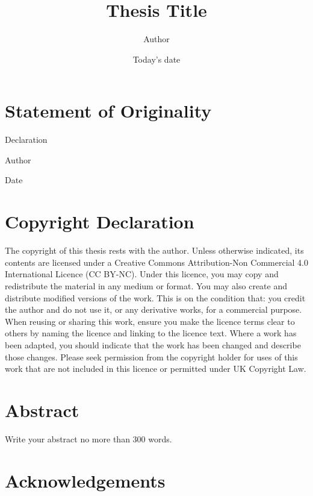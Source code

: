\documentclass[12pt]{report}
\begin{document}
\title{Thesis Title}
\author{Author}
\date{Today's date} 

\maketitle
\newpage
{}
\setcounter{page}{2}
\chapter*{Statement of Originality}
Declaration

\hspace{5.5in} Author

\hspace{5.5in} Date



\chapter*{Copyright Declaration}
The copyright of this thesis rests with the author. Unless otherwise indicated,
its contents are licensed under a Creative Commons Attribution-Non
Commercial 4.0 International Licence (CC BY-NC).
Under this licence, you may copy and redistribute the material in any medium
or format. You may also create and distribute modified versions of the work.
This is on the condition that: you credit the author and do not use it, or any
derivative works, for a commercial purpose.
When reusing or sharing this work, ensure you make the licence terms clear to
others by naming the licence and linking to the licence text. Where a work has
been adapted, you should indicate that the work has been changed and
describe those changes.
Please seek permission from the copyright holder for uses of this work that are
not included in this licence or permitted under UK Copyright Law.


\chapter*{Abstract}
Write your abstract no more than 300 words.

\chapter*{Acknowledgements}

\tableofcontents

\listoffigures
\listoftables






\clearpage
\begingroup
    \linespread{1}
    
\endgroup
\begin{appendices}

\end{appendices}
\end{document}
